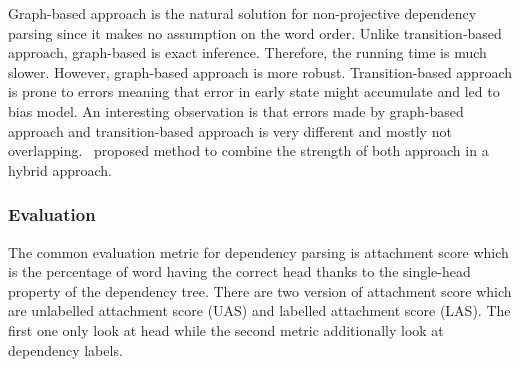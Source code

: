 \documentclass[12pt,twoside,final,hidelinks]{ltthesis}
\theoremstyle{definition}
\begin{document}
Graph-based approach is the natural solution for non-projective dependency parsing since it makes no assumption on the word order. Unlike transition-based approach, graph-based is exact inference. Therefore, the running time is much slower. However, graph-based approach is more robust. Transition-based approach is prone to errors meaning that error in early state might accumulate and led to bias model. An interesting observation is that errors made by graph-based approach and transition-based approach is very different and mostly not overlapping.~ proposed method to combine the strength of both approach in a hybrid approach. 

\subsubsection{Evaluation}
The common evaluation metric for dependency parsing is attachment score which is the percentage of word having the correct head thanks to the single-head property of the dependency tree. There are two version of attachment score which are unlabelled attachment score (UAS) and labelled attachment score (LAS). The first one only look at head while the second metric additionally look at dependency labels. 
\end{document}
